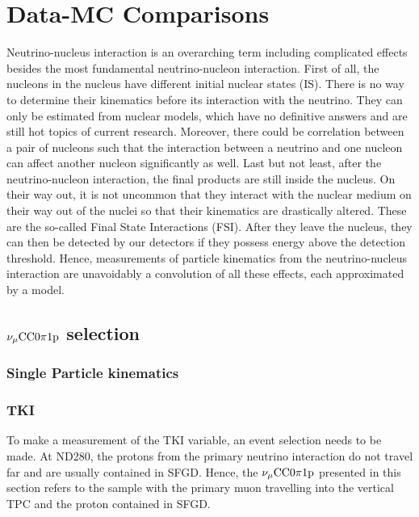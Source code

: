 \section{Data-MC Comparisons}


       Neutrino-nucleus interaction is an overarching term including complicated effects besides the most fundamental neutrino-nucleon interaction. 
       First of all, the nucleons in the nucleus have different initial nuclear states (IS). 
       There is no way to determine their kinematics before its interaction with the neutrino. 
       They can only be estimated from nuclear models, which have no definitive answers and are still hot topics of current research. 
       Moreover, there could be correlation between a pair of nucleons such that the interaction between a neutrino and one nucleon can affect another nucleon significantly as well. Last but not least, after the neutrino-nucleon interaction, the final products are still inside the nucleus. 
       On their way out, it is not uncommon that they interact with the nuclear medium on their way out of the nuclei so that their kinematics are drastically altered. 
       These are the so-called Final State Interactions (FSI). 
       After they leave the nucleus, they can then be detected by our detectors if they possess energy above the detection threshold. 
       Hence, measurements of particle kinematics from the neutrino-nucleus interaction are unavoidably a convolution of all these effects, each approximated by a model. 
   

    \subsection{$\nu_{\mu}\textrm{CC}0\pi1\textrm{p}$ selection}

    \subsubsection{Single Particle kinematics}
    
     \subsubsection{TKI}
        To make a measurement of the TKI variable, an event selection needs to be made.
        At ND280, the protons from the primary neutrino interaction do not travel far and are usually contained in SFGD. 
        Hence, the $\nu_{\mu}\textrm{CC}0\pi1\textrm{p}$ presented in this section refers to the sample with the primary muon travelling into the vertical TPC and the proton contained in SFGD. 
        
